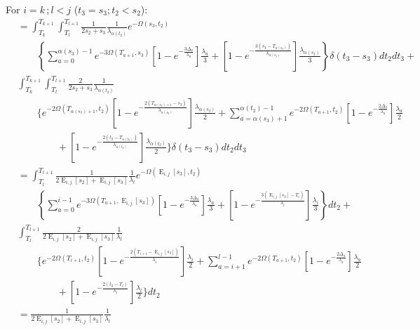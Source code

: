 \documentclass{article}
\DeclareMathOperator{\E}{E}
\begin{document}
For $i=k\,;l<j$ ($t_3=s_3; t_2<s_2$): %
\begin{align*}
    &=\int_{T_k}^{T_{k+1}}\int_{T_l}^{T_{l+1}}\frac{1}{2s_2+s_3}\frac{1}{\lambda_{\alpha(t_2)}}e^{-\Omega(s_3,t_2)}\\
    &\qquad\left\{\sum_{a=0}^{\alpha(s_3)-1}e^{-3\Omega(T_{a+1},s_3)}
        \left[1-e^{-\frac{3\Delta_a}{\lambda_a}}\right]\frac{\lambda_a}{3}+
    \left[1-e^{-\frac{3\left(s_3-T_{\alpha(s_3)}\right)}{\lambda_{\alpha(s_3)}}}\right]
        \frac{\lambda_{\alpha(s_3)}}{3}\right\}\delta(t_3-s_3)dt_2dt_3+\\
        &\int_{T_k}^{T_{k+1}}\int_{T_l}^{T_{l+1}}\frac{2}{2s_2+s_3}\frac{1}{\lambda_{\alpha(t_2)}}\\
    &\qquad\Bigg\{e^{-2\Omega(T_{\alpha(s_3)+1},t_2)}\left[1-e^{-\frac{2\left(T_{\alpha(s_3)+1}-s_3\right)}{\lambda_{\alpha(s_3)}}}\right]\frac{\lambda_{\alpha(s_3)}}{2}+\sum_{a=\alpha(s_3)+1}^{\alpha(t_2)-1}e^{-2\Omega\left(T_{a+1},t_2\right)}\left[1-e^{-\frac{2\Delta_a}{\lambda_a}}\right]\frac{\lambda_a}{2}\\
    &\qquad\qquad+\left[1-e^{-\frac{2\left(t_2-T_{\alpha(t_2)}\right)}{\lambda_{\alpha(t_2)}}}\right]\frac{\lambda_{\alpha(t_2)}}{2}
    \Bigg\}\delta(t_3-s_3)dt_2dt_3\\[2em]
    &=\int_{T_l}^{T_{l+1}}\frac{1}{2\E_{i,j}[s_2]+\E_{i,j}[s_3]}\frac{1}{\lambda_l}e^{-\Omega(\E_{i,j}[s_3],t_2)}\\
    &\qquad\left\{\sum_{a=0}^{i-1}e^{-3\Omega(T_{a+1},\E_{i,j}[s_3])}
        \left[1-e^{-\frac{3\Delta_a}{\lambda_a}}\right]\frac{\lambda_a}{3}+
    \left[1-e^{-\frac{3\left(\E_{i,j}[s_3]-T_{i}\right)}{\lambda_{i}}}\right]
        \frac{\lambda_{i}}{3}\right\}dt_2+\\
        &\int_{T_l}^{T_{l+1}}\frac{2}{2\E_{i,j}[s_2]+\E_{i,j}[s_3]}\frac{1}{\lambda_{l}}\\
    &\qquad\Bigg\{e^{-2\Omega(T_{i+1},t_2)}\left[1-e^{-\frac{2\left(T_{i+1}-\E_{i,j}[s_3]\right)}{\lambda_{i}}}\right]\frac{\lambda_{i}}{2}+\sum_{a=i+1}^{l-1}e^{-2\Omega\left(T_{a+1},t_2\right)}\left[1-e^{-\frac{2\Delta_a}{\lambda_a}}\right]\frac{\lambda_a}{2}\\
    &\qquad\qquad+\left[1-e^{-\frac{2\left(t_2-T_{l}\right)}{\lambda_{l}}}\right]\frac{\lambda_{l}}{2}
    \Bigg\}dt_2\\[2em]
    &=\frac{1}{2\E_{i,j}[s_2]+\E_{i,j}[s_3]}\frac{1}{\lambda_l}\\

\end{align*}
\end{document}
